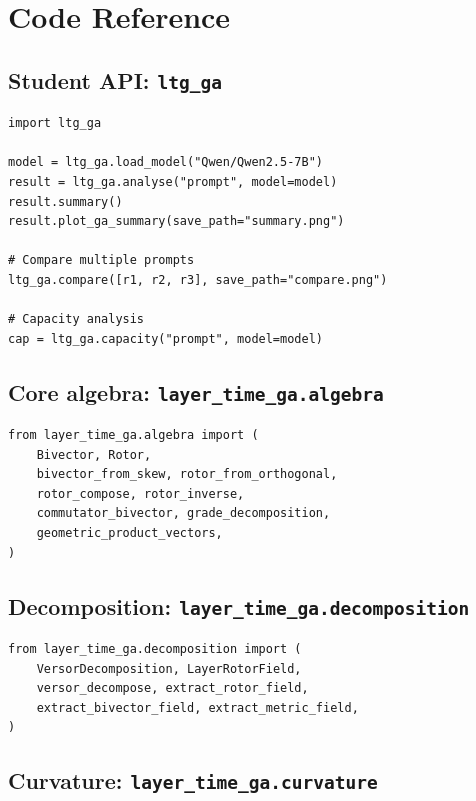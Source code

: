\documentclass[11pt, twoside, openright]{memoir}
\numberwithin{equation}{chapter}
\begin{document}
\chapter{Code Reference}
\label{app:code}

\section{Student API: \texttt{ltg\_ga}}

\begin{lstlisting}
import ltg_ga

model = ltg_ga.load_model("Qwen/Qwen2.5-7B")
result = ltg_ga.analyse("prompt", model=model)
result.summary()
result.plot_ga_summary(save_path="summary.png")

# Compare multiple prompts
ltg_ga.compare([r1, r2, r3], save_path="compare.png")

# Capacity analysis
cap = ltg_ga.capacity("prompt", model=model)
\end{lstlisting}

\section{Core algebra: \texttt{layer\_time\_ga.algebra}}

\begin{lstlisting}
from layer_time_ga.algebra import (
    Bivector, Rotor,
    bivector_from_skew, rotor_from_orthogonal,
    rotor_compose, rotor_inverse,
    commutator_bivector, grade_decomposition,
    geometric_product_vectors,
)
\end{lstlisting}

\section{Decomposition: \texttt{layer\_time\_ga.decomposition}}

\begin{lstlisting}
from layer_time_ga.decomposition import (
    VersorDecomposition, LayerRotorField,
    versor_decompose, extract_rotor_field,
    extract_bivector_field, extract_metric_field,
)
\end{lstlisting}

\section{Curvature: \texttt{layer\_time\_ga.curvature}}
\end{document}

